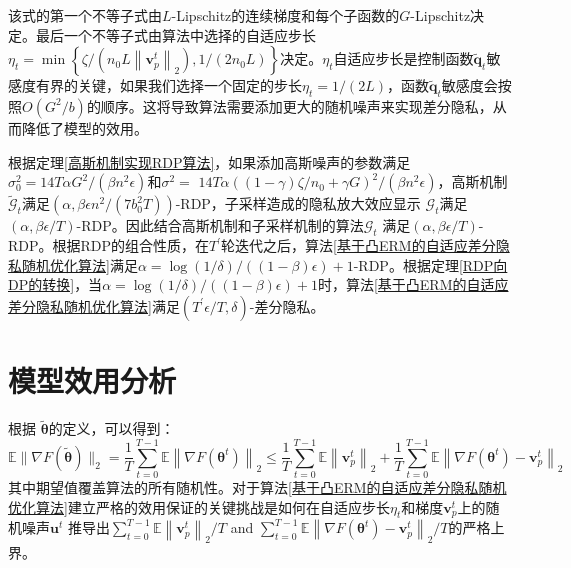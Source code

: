 该式的第一个不等子式由$L$-Lipschitz的连续梯度和每个子函数的$G$-Lipschitz决定。最后一个不等子式由算法中选择的自适应步长$\eta_{t}=\min \left\{\zeta /\left(n_{0} L\left\|\mathbf{v}_{p}^{t}\right\|_{2}\right), 1 /\left(2 n_{0} L\right)\right\}$决定。$\eta_{t}$自适应步长是控制函数$\widetilde{\mathbf{q}}_{t}$敏感度有界的关键，如果我们选择一个固定的步长$\eta_{t}=1 /(2 L)$，函数$\widetilde{\mathbf{q}}_{t}$敏感度会按照$O\left(G^{2} / b\right)$的顺序。这将导致算法需要添加更大的随机噪声来实现差分隐私，从而降低了模型的效用。

根据定理\ref{高斯机制实现RDP算法}，如果添加高斯噪声的参数满足$\sigma_{0}^{2}=14 T \alpha G^{2} /\left(\beta n^{2} \epsilon\right)$和$\sigma^{2}=$ $14 T \alpha\left((1-\gamma) \zeta / n_{0}+\gamma G\right)^{2} /\left(\beta n^{2} \epsilon\right)$，高斯机制$\widetilde{\mathcal{G}}_{t}$满足$\left(\alpha, \beta \epsilon n^{2} /\left(7 b_{0}^{2} T\right)\right)$-RDP，子采样造成的隐私放大效应显示 $\mathcal{G}_{t}$满足$(\alpha, \beta \epsilon / T)$-RDP。因此结合高斯机制和子采样机制的算法$\mathcal{G}_{t}$ 满足$(\alpha, \beta \epsilon / T)$-RDP。根据RDP的组合性质，在$T^{\prime}$轮迭代之后，算法\ref{基于凸ERM的自适应差分隐私随机优化算法}满足$\alpha=\log (1 / \delta) /((1-\beta) \epsilon)+1$-RDP。根据定理\ref{RDP向DP的转换}，当$\alpha=\log (1 / \delta) /((1-\beta) \epsilon)+1$时，算法\ref{基于凸ERM的自适应差分隐私随机优化算法}满足$\left(T^{\prime} \epsilon / T, \delta\right)$-差分隐私。

\section{模型效用分析}
根据 $\widetilde{\boldsymbol{\theta}}$的定义，可以得到：
$$
\mathbb{E}\|\nabla F(\widetilde{\boldsymbol{\theta}})\|_{2}=\frac{1}{T} \sum_{t=0}^{T-1} \mathbb{E}\left\|\nabla F\left(\boldsymbol{\theta}^{t}\right)\right\|_{2} \leq \frac{1}{T} \sum_{t=0}^{T-1} \mathbb{E}\left\|\mathbf{v}_{p}^{t}\right\|_{2}+\frac{1}{T} \sum_{t=0}^{T-1} \mathbb{E}\left\|\nabla F\left(\boldsymbol{\theta}^{t}\right)-\mathbf{v}_{p}^{t}\right\|_{2}
$$
其中期望值覆盖算法的所有随机性。对于算法\ref{基于凸ERM的自适应差分隐私随机优化算法}建立严格的效用保证的关键挑战是如何在自适应步长$\eta_{t}$和梯度$\mathbf{v}_{p}^{t}$上的随机噪声$\mathbf{u}^{t}$
推导出$\sum_{t=0}^{T-1} \mathbb{E}\left\|\mathbf{v}_{p}^{t}\right\|_{2} / T$ and $\sum_{t=0}^{T-1} \mathbb{E}\left\|\nabla F\left(\boldsymbol{\theta}^{t}\right)-\mathbf{v}_{p}^{t}\right\|_{2} / T$的严格上界。

